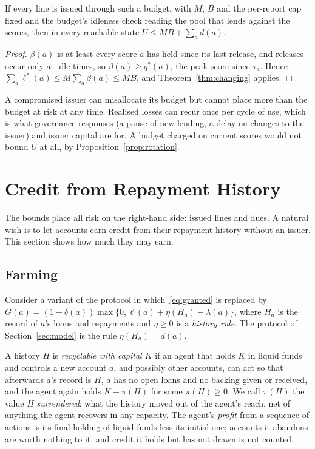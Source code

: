 \documentclass[acmsmall,nonacm,screen]{acmart}
\theoremstyle{acmdefinition}%
\begin{document}
\begin{corollary}\label{cor:budget}
If every line is issued through such a budget, with $M$, $B$ and the per-report cap fixed and the
budget's idleness check reading the pool that lends against the scores, then in every reachable state
$U\le MB+\sum_a d(a)$.
\end{corollary}

\begin{proof}
$\beta(a)$ is at least every score $a$ has held since its last release, and releases occur only at
idle times, so $\beta(a)\ge q^*(a)$, the peak score since $\tau_a$. Hence
$\sum_a\ell^*(a)\le M\sum_a\beta(a)\le MB$, and Theorem~\ref{thm:changing} applies.
\end{proof}

A compromised issuer can misallocate its budget but cannot place more than the budget at risk at
any time. Realised losses can recur once per cycle of use, which is what governance responses (a
pause of new lending, a delay on changes to the issuer) and issuer capital are for. A budget
charged on current scores would not bound $U$ at all, by Proposition~\ref{prop:rotation}.

\section{Credit from Repayment History}\label{sec:history}

The bounds place all risk on the right-hand side: issued lines and dues. A natural wish is to let
accounts earn credit from their repayment history without an issuer. This section shows how much
they may earn.

\subsection{Farming}

Consider a variant of the protocol in which~\eqref{eq:granted} is replaced by
$G(a)=(1-\delta(a))\max\{0,\ell(a)+\eta(H_a)-\lambda(a)\}$, where $H_a$ is the record of $a$'s loans
and repayments and $\eta\ge0$ is a \emph{history rule}. The protocol of Section~\ref{sec:model} is
the rule $\eta(H_a)=d(a)$.

\begin{definition}\label{def:recyclable}
A history $H$ is \emph{recyclable with capital $K$} if an agent that holds $K$ in liquid funds and
controls a new account $a$, and possibly other accounts, can act so that afterwards $a$'s record is
$H$, $a$ has no open loans and no backing given or received, and the agent again holds
$K-\pi(H)$ for some $\pi(H)\ge0$. We call $\pi(H)$ the value $H$ \emph{surrendered}: what the
history moved out of the agent's reach, net of anything the agent recovers in any capacity. The
agent's \emph{profit} from a sequence of actions is its final holding of liquid funds less its
initial one; accounts it abandons are worth nothing to it, and credit it holds but has not drawn is
not counted.
\end{definition}
\end{document}
